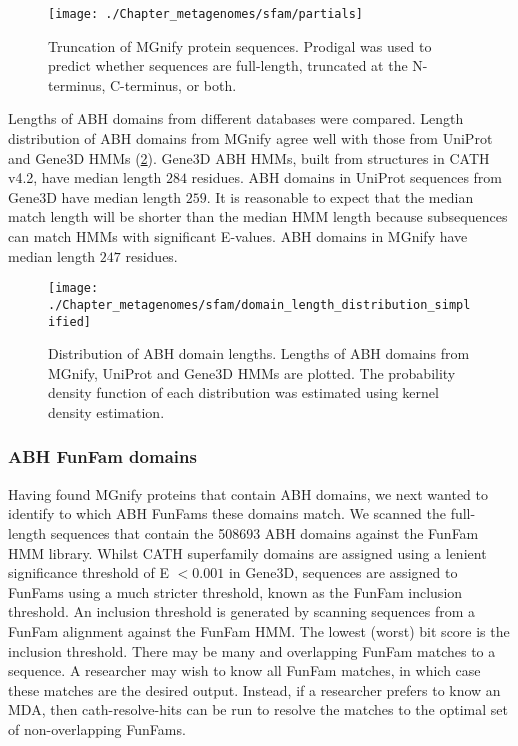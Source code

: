 \begin{figure}[!hbt]
    \centering
    \texttt{[image: ./Chapter\_metagenomes/sfam/partials]}
    \caption{%
        Truncation of MGnify protein sequences.
        Prodigal was used to predict whether sequences are full-length, truncated at the N-terminus, C-terminus, or both.
    }
    \label{fig:partials}
\end{figure}

Lengths of ABH domains from different databases were compared. Length distribution of ABH domains from MGnify agree well with those from UniProt and Gene$3$D HMMs (\ref{fig:domain-length-distribution}). Gene$3$D ABH HMMs, built from structures in CATH v4.2, have median length $284$ residues. ABH domains in UniProt sequences from Gene$3$D have median length $259$. It is reasonable to expect that the median match length will be shorter than the median HMM length because subsequences can match HMMs with significant E-values. ABH domains in MGnify have median length $247$ residues.

\begin{figure}[!hbt]
    \centering
    \texttt{[image: ./Chapter\_metagenomes/sfam/domain\_length\_distribution\_simplified]}
    \caption{%
        Distribution of ABH domain lengths.
        Lengths of ABH domains from MGnify, UniProt and Gene$3$D HMMs are plotted.
        The probability density function of each distribution was estimated using kernel density estimation.
    }
    \label{fig:domain-length-distribution}
\end{figure}

\subsubsection{ABH FunFam domains}

Having found MGnify proteins that contain ABH domains, we next wanted to identify to which ABH FunFams these domains match. We scanned the full-length sequences that contain the \num{508693} ABH domains against the FunFam HMM library. Whilst CATH superfamily domains are assigned using a lenient significance threshold of E $<0.001$ in Gene$3$D, sequences are assigned to FunFams using a much stricter threshold, known as the FunFam inclusion threshold. An inclusion threshold is generated by scanning sequences from a FunFam alignment against the FunFam HMM. The lowest (worst) bit score is the inclusion threshold. There may be many and overlapping FunFam matches to a sequence. A researcher may wish to know all FunFam matches, in which case these matches are the desired output. Instead, if a researcher prefers to know an MDA, then cath-resolve-hits can be run to resolve the matches to the optimal set of non-overlapping FunFams.

